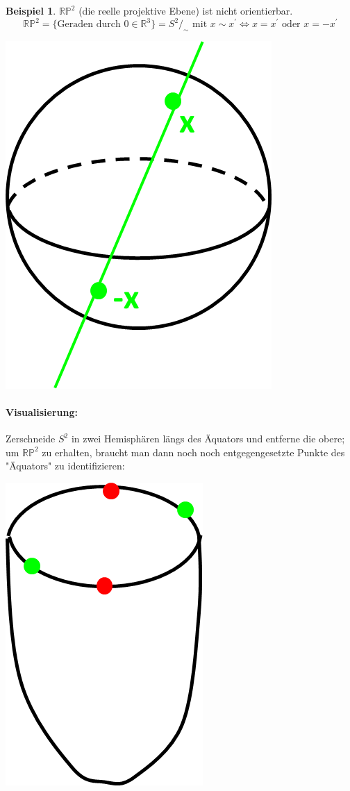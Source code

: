 \documentclass[a4paper,11pt,notitlepage]{report}
\theoremstyle{definition}
\newtheorem{example}{Beispiel}[chapter]
\newcommand{\R}{{\ensuremath{\mathbb{R}}}}
\newcommand{\Prim}{{\ensuremath{\mathbb{P}}}}
\begin{document}
\begin{example}
	$\R \Prim^2$ (die reelle projektive Ebene) ist nicht orientierbar.
	$$\R \Prim^2 = \{\text{Geraden durch } 0 \in \R^3\} = S^2/_\sim \text{ mit } x \sim x^\prime \Leftrightarrow x = x^\prime \text{ oder } x = -x^\prime$$
	\begin{center}
	 	\includegraphics[scale=0.5]{images/2012_01_10_Bild05.png}
	 \end{center}
	
	\paragraph{Visualisierung:} Zerschneide $S^2$ in zwei Hemisphären längs des Äquators und entferne die obere; um $\R \Prim^2$ zu erhalten, braucht man dann noch noch entgegengesetzte Punkte des "Äquators" zu identifizieren:
	\begin{center}
	 	\includegraphics[scale=0.5]{images/2012_01_10_Bild06.png}
	 \end{center}
	

\end{example}
\end{document}
